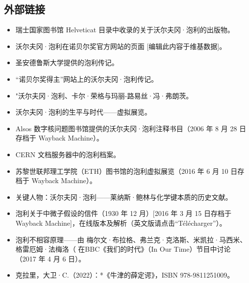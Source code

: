 \subsection{外部链接}
\begin{itemize}
\item 瑞士国家图书馆 Helveticat 目录中收录的关于沃尔夫冈·泡利的出版物。  
\item 沃尔夫冈·泡利在诺贝尔奖官方网站的页面 [编辑此内容于维基数据]。  
\item 圣安德鲁斯大学提供的泡利传记。  
\item “诺贝尔奖得主”网站上的沃尔夫冈·泡利传记。  
\item "沃尔夫冈·泡利、卡尔·荣格与玛丽-路易丝·冯·弗朗茨。  
\item 沃尔夫冈·泡利的生平与时代——虚拟展览。  
\item Alsos 数字核问题图书馆提供的沃尔夫冈·泡利注释书目（2006 年 8 月 28 日存档于 Wayback Machine）。  
\item CERN 文档服务器中的泡利档案。  
\item 苏黎世联邦理工学院（ETH）图书馆的泡利虚拟展览（2016 年 6 月 10 日存档于 Wayback Machine）。  
\item 关键人物：沃尔夫冈·泡利——莱纳斯·鲍林与化学键本质的历史文献。  
\item 泡利关于中微子假设的信件（1930 年 12 月）[2016 年 3 月 15 日存档于 Wayback Machine]，在线版本及解析（英文版请点击“Télécharger”）。  
\item 泡利不相容原理——由 梅尔文·布拉格、弗兰克·克洛斯、米凯拉·马西米、格雷厄姆·法梅洛（ 在BBC《我们的时代》（In Our Time）节目中讨论（2017 年 4 月 6 日）。  
\item 克拉里，大卫·C.（2022）：*《牛津的薛定谔》，ISBN 978-9811251009。
\end{itemize}